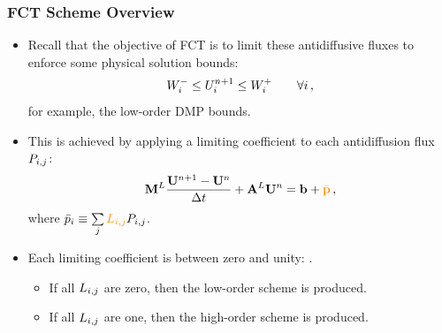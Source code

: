 \begin{frame}
\frametitle{FCT Scheme Overview}

\begin{itemize}
   \item Recall that the objective of FCT is to limit these antidiffusive
      fluxes to enforce some physical solution bounds:
      \begin{equation}
         W_i^-\leq
         U_i^{n+1}\leq
         W_i^+\qquad\forall i \,,
      \end{equation}
      for example, the low-order DMP bounds.
   \item This is achieved by applying a limiting coefficient  to each
      antidiffusion flux $\correctionfluxij$:
      \begin{equation}
        \lumpedmassmatrix\frac{\solutionvector^{n+1}-\solutionvector^n}{\dt}
          + \ssmatrix^L\solutionvector^n = \ssrhs
          + \hlorange{\bar{\correctionfluxvector}} \eqc
      \end{equation}
      where $\bar{\correctionfluxletter}_i \equiv \sumj\hlorange{L\ij}\correctionfluxij$.
   \item Each limiting coefficient is between zero and unity:
     .
   \begin{itemize}
      \item If all $L_{i,j}$ are zero, then the low-order scheme is produced.
      \item If all $L_{i,j}$ are one, then the high-order scheme is produced.
   \end{itemize}
\end{itemize}

\end{frame}
